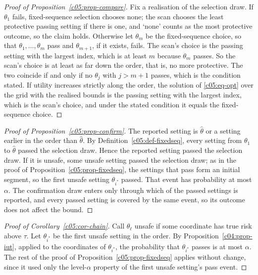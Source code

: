 \begin{proof}[Proof of Proposition~\ref{c05:prop-compare}]
Fix a realisation of the selection draw. If $\theta_1$ fails, fixed-sequence selection
chooses none; the scan chooses the least protective passing setting if there is one, and
`none' counts as the most protective outcome, so the claim holds. Otherwise let
$\theta_m$ be the fixed-sequence choice, so that $\theta_1,\dots,\theta_m$ pass and
$\theta_{m+1}$, if it exists, fails. The scan's choice is the passing setting with the
largest index, which is at least $m$ because $\theta_m$ passes. So the scan's choice is
at least as far down the order, that is, no more protective. The two coincide if and only
if no $\theta_j$ with $j > m+1$ passes, which is the condition stated. If utility
increases strictly along the order, the solution of \eqref{c05:eq-opt} over the grid with
the realised bounds is the passing setting with the largest index, which is the scan's
choice, and under the stated condition it equals the fixed-sequence choice.
\end{proof}

\begin{proof}[Proof of Proposition~\ref{c05:prop-confirm}]
The reported setting is $\hat\theta$ or a setting earlier in the order than
$\hat\theta$. By Definition~\ref{c05:def-fixedseq}, every setting from $\theta_1$ to
$\hat\theta$ passed the selection draw. Hence the reported setting passed the selection
draw. If it is unsafe, some unsafe setting passed the selection draw; as in the proof of
Proposition~\ref{c05:prop-fixedseq}, the settings that pass form an initial segment, so
the first unsafe setting $\theta_{i^\ast}$ passed. That event has probability at most
$\alpha$. The confirmation draw enters only through which of the passed settings is
reported, and every passed setting is covered by the same event, so its outcome does not
affect the bound.
\end{proof}

\begin{proof}[Proof of Corollary~\ref{c05:cor-chain}]
Call $\theta_\ell$ unsafe if some coordinate has true risk above $\tau$. Let
$\theta_{i^\ast}$ be the first unsafe setting in the order. By
Proposition~\ref{c04:prop-iut}, applied to the coordinates of $\theta_{i^\ast}$, the
probability that $\theta_{i^\ast}$ passes is at most $\alpha$. The rest of the proof of
Proposition~\ref{c05:prop-fixedseq} applies without change, since it used only the
level-$\alpha$ property of the first unsafe setting's pass event.
\end{proof}
